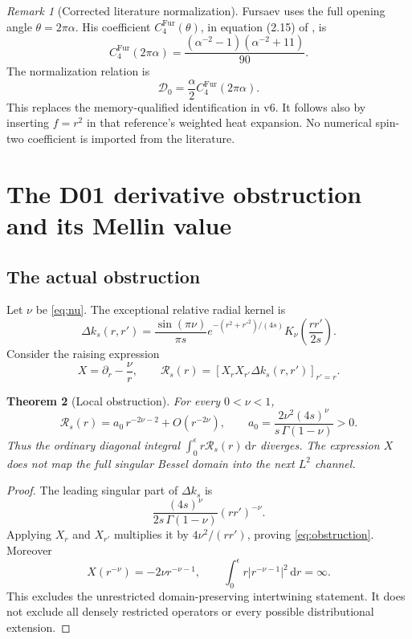 \documentclass[11pt,a4paper]{article}
\newcommand{\dd}{\mathrm d}
\newcommand{\abs}[1]{\lvert#1\rvert}
\newcommand{\Dcal}{\mathcal D}
\theoremstyle{plain}
\newtheorem{theorem}{Theorem}[section]
\theoremstyle{definition}
\theoremstyle{remark}
\newtheorem{remark}[theorem]{Remark}
\numberwithin{equation}{section}
\begin{document}
\begin{remark}[Corrected literature normalization]
\label{rem:Fursaevnorm}
Fursaev uses the full opening angle \(\theta=2\pi\alpha\).
His coefficient \(C_4^{\mathrm{Fur}}(\theta)\), in
equation (2.15) of \cite{Fursaev1994}, is
\[
 C_4^{\mathrm{Fur}}(2\pi\alpha)
 =\frac{(\alpha^{-2}-1)(\alpha^{-2}+11)}{90}.
\]
The normalization relation is
\[
 \boxed{\ \Dcal_0=\frac{\alpha}{2}
                  C_4^{\mathrm{Fur}}(2\pi\alpha).\ }
\]
This replaces the memory-qualified identification in v6.
It follows also by inserting \(f=r^2\) in that reference's
weighted heat expansion. No numerical spin-two coefficient is
imported from the literature.
\end{remark}

\section{The D01 derivative obstruction and its Mellin value}
\label{sec:Mellin}

\subsection{The actual obstruction}

Let \(\nu\) be \eqref{eq:nu}. The exceptional relative radial
kernel is
\[
 \Delta k_s(r,r')
 =\frac{\sin(\pi\nu)}{\pi s}
   e^{-(r^2+r'^2)/(4s)}
   K_\nu\!\left(\frac{rr'}{2s}\right).
\]
Consider the raising expression
\[
 X=\partial_r-\frac{\nu}{r},
 \qquad
 \mathcal R_s(r)=
 \left[X_rX_{r'}\Delta k_s(r,r')\right]_{r'=r}.
\]

\begin{theorem}[Local obstruction]
\label{thm:obstruction}
For every \(0<\nu<1\),
\begin{equation}
 \mathcal R_s(r)
 =a_0\,r^{-2\nu-2}+O(r^{-2\nu}),
 \qquad
 a_0=\frac{2\nu^2(4s)^\nu}
               {s\,\Gamma(1-\nu)}>0.
 \label{eq:obstruction}
\end{equation}
Thus the ordinary diagonal integral
\(\int_0^\epsilon r\mathcal R_s(r)\,\dd r\) diverges.
The expression \(X\) does not map the full singular Bessel
domain into the next \(L^2\) channel.
\end{theorem}

\begin{proof}
The leading singular part of \(\Delta k_s\) is
\[
 \frac{(4s)^\nu}{2s\,\Gamma(1-\nu)}(rr')^{-\nu}.
\]
Applying \(X_r\) and \(X_{r'}\) multiplies it by
\(4\nu^2/(rr')\), proving \eqref{eq:obstruction}.
Moreover
\[
 X(r^{-\nu})=-2\nu r^{-\nu-1},
 \qquad
 \int_0^\epsilon r\abs{r^{-\nu-1}}^2\,\dd r=\infty.
\]
This excludes the unrestricted domain-preserving intertwining
statement. It does not exclude all densely restricted operators
or every possible distributional extension.
\end{proof}
\end{document}
